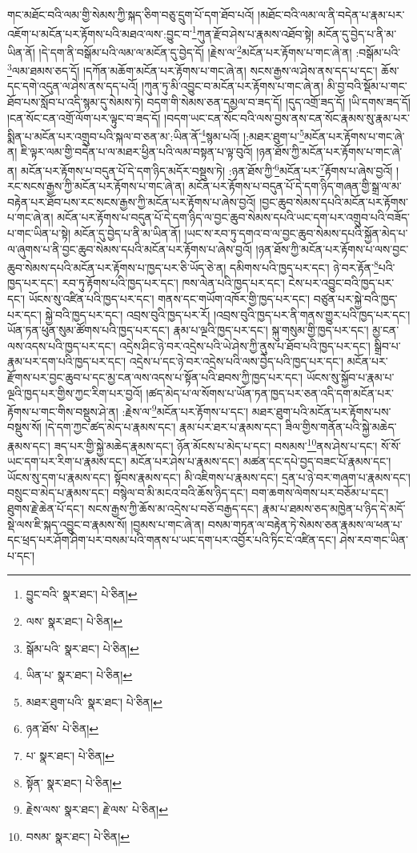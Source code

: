 གང་མཐོང་བའི་ལམ་གྱི་སེམས་ཀྱི་སྐད་ཅིག་བཅུ་དྲུག་པོ་དག་ཐོབ་པའོ། །མཐོང་བའི་ལམ་ལ་ནི་བདེན་པ་རྣམ་པར་འཇོག་པ་མངོན་པར་རྟོགས་པའི་མཐའ་ལས་:བྱུང་བ་\footnote{བྱུང་བའི་  སྣར་ཐང་།  པེ་ཅིན། }ཀུན་རྫོབ་ཤེས་པ་རྣམས་འཐོབ་སྟེ། མངོན་དུ་བྱེད་པ་ནི་མ་ཡིན་ནོ། །དེ་དག་ནི་བསྒོམ་པའི་ལམ་ལ་མངོན་དུ་བྱེད་དོ། །རྗེས་ལ་\footnote{ལས་  སྣར་ཐང་།  པེ་ཅིན། }མངོན་པར་རྟོགས་པ་གང་ཞེ་ན། :བསྒོམ་པའི་\footnote{སྒོམ་པའི་  སྣར་ཐང་།  པེ་ཅིན། }ལམ་ཐམས་ཅད་དོ། །དཀོན་མཆོག་མངོན་པར་རྟོགས་པ་གང་ཞེ་ན། སངས་རྒྱས་ལ་ཤེས་ནས་དད་པ་དང་། ཆོས་དང་དགེ་འདུན་ལ་ཤེས་ནས་དད་པའོ། །ཀུན་ཏུ་མི་འབྱུང་བ་མངོན་པར་རྟོགས་པ་གང་ཞེ་ན། མི་བྱ་བའི་སྡོམ་པ་གང་ཐོབ་པས་སློབ་པ་འདི་སྙམ་དུ་སེམས་ཏེ། བདག་གི་སེམས་ཅན་དམྱལ་བ་ཟད་དོ། །དུད་འགྲོ་ཟད་དོ། །ཡི་དགས་ཟད་དོ། །ངན་སོང་ངན་འགྲོ་ལོག་པར་ལྟུང་བ་ཟད་དོ། །བདག་ཡང་ངན་སོང་བའི་ལས་བྱས་ནས་ངན་སོང་རྣམས་སུ་རྣམ་པར་སྨིན་པ་མངོན་པར་འགྲུབ་པའི་སྐལ་བ་ཅན་མ་:ཡིན་ནོ་\footnote{ཡིན་པ་  སྣར་ཐང་།  པེ་ཅིན། }སྙམ་པའོ། །:མཐར་ཐུག་པ་\footnote{མཐར་ཐུག་པའི་  སྣར་ཐང་།  པེ་ཅིན། }མངོན་པར་རྟོགས་པ་གང་ཞེ་ན། ཇི་ལྟར་ལམ་གྱི་བདེན་པ་ལ་མཐར་ཕྱིན་པའི་ལམ་བསྟན་པ་ལྟ་བུའོ། །ཉན་ཐོས་ཀྱི་མངོན་པར་རྟོགས་པ་གང་ཞེ་ན། མངོན་པར་རྟོགས་པ་བདུན་པོ་དེ་དག་ཉིད་མདོར་བསྡུས་ཏེ། :ཉན་ཐོས་ཀྱི་\footnote{ཉན་ཐོས་  པེ་ཅིན། }མངོན་པར་\footnote{པ་  སྣར་ཐང་།  པེ་ཅིན། }རྟོགས་པ་ཞེས་བྱའོ། །རང་སངས་རྒྱས་ཀྱི་མངོན་པར་རྟོགས་པ་གང་ཞེ་ན། མངོན་པར་རྟོགས་པ་བདུན་པོ་དེ་དག་ཉིད་གཞན་གྱི་སྒྲ་ལ་མ་བརྟེན་པར་ཐོབ་པས་རང་སངས་རྒྱས་ཀྱི་མངོན་པར་རྟོགས་པ་ཞེས་བྱའོ། །བྱང་ཆུབ་སེམས་དཔའི་མངོན་པར་རྟོགས་པ་གང་ཞེ་ན། མངོན་པར་རྟོགས་པ་བདུན་པོ་དེ་དག་ཉིད་ལ་བྱང་ཆུབ་སེམས་དཔའི་ཡང་དག་པར་འགྲུབ་པའི་བཟོད་པ་གང་ཡིན་པ་སྟེ། མངོན་དུ་བྱེད་པ་ནི་མ་ཡིན་ནོ། །ཡང་ས་རབ་ཏུ་དགའ་བ་ལ་བྱང་ཆུབ་སེམས་དཔའི་སྐྱོན་མེད་པ་ལ་ཞུགས་པ་ནི་བྱང་ཆུབ་སེམས་དཔའི་མངོན་པར་རྟོགས་པ་ཞེས་བྱའོ། །ཉན་ཐོས་ཀྱི་མངོན་པར་རྟོགས་པ་ལས་བྱང་ཆུབ་སེམས་དཔའི་མངོན་པར་རྟོགས་པ་ཁྱད་པར་ཅི་ཡོད་ཅེ་ན། དམིགས་པའི་ཁྱད་པར་དང་། ཉེ་བར་རྟོན་\footnote{སྟོན་  སྣར་ཐང་།  པེ་ཅིན། }པའི་ཁྱད་པར་དང་། རབ་ཏུ་རྟོགས་པའི་ཁྱད་པར་དང་། ཁས་ལེན་པའི་ཁྱད་པར་དང་། ངེས་པར་འབྱུང་བའི་ཁྱད་པར་དང་། ཡོངས་སུ་འཛིན་པའི་ཁྱད་པར་དང་། གནས་དང་གཡོག་འཁོར་གྱི་ཁྱད་པར་དང་། བཙུན་པར་སྐྱེ་བའི་ཁྱད་པར་དང་། སྐྱེ་བའི་ཁྱད་པར་དང་། འབྲས་བུའི་ཁྱད་པར་རོ། །འབྲས་བུའི་ཁྱད་པར་ནི་གནས་གྱུར་པའི་ཁྱད་པར་དང་། ཡོན་ཏན་ཕུན་སུམ་ཚོགས་པའི་ཁྱད་པར་དང་། རྣམ་པ་ལྔའི་ཁྱད་པར་དང་། སྐུ་གསུམ་གྱི་ཁྱད་པར་དང་། མྱ་ངན་ལས་འདས་པའི་ཁྱད་པར་དང་། འདྲེས་ཤིང་ཉེ་བར་འདྲེས་པའི་ཡེ་ཤེས་ཀྱི་ནུས་པ་ཐོབ་པའི་ཁྱད་པར་དང་། སྒྲིབ་པ་རྣམ་པར་དག་པའི་ཁྱད་པར་དང་། འདྲེས་པ་དང་ཉེ་བར་འདྲེས་པའི་ལས་བྱེད་པའི་ཁྱད་པར་དང་། མངོན་པར་རྫོགས་པར་བྱང་ཆུབ་པ་དང་མྱ་ངན་ལས་འདས་པ་སྟོན་པའི་ཐབས་ཀྱི་ཁྱད་པར་དང་། ཡོངས་སུ་སྐྱོབ་པ་རྣམ་པ་ལྔའི་ཁྱད་པར་གྱིས་ཀྱང་རིག་པར་བྱའོ། །ཚད་མེད་པ་ལ་སོགས་པ་ཡོན་ཏན་ཁྱད་པར་ཅན་འདི་དག་མངོན་པར་རྟོགས་པ་གང་གིས་བསྡུས་ཤེ་ན། :རྗེས་ལ་\footnote{རྗེས་ལས་  སྣར་ཐང་། རྗེ་ལས་  པེ་ཅིན། }མངོན་པར་རྟོགས་པ་དང་། མཐར་ཐུག་པའི་མངོན་པར་རྟོགས་པས་བསྡུས་སོ། །དེ་དག་ཀྱང་ཚད་མེད་པ་རྣམས་དང་། རྣམ་པར་ཐར་པ་རྣམས་དང་། ཟིལ་གྱིས་གནོན་པའི་སྐྱེ་མཆེད་རྣམས་དང་། ཟད་པར་གྱི་སྐྱེ་མཆེད་རྣམས་དང་། ཉོན་མོངས་པ་མེད་པ་དང་། བསམས་\footnote{བསམ་  སྣར་ཐང་།  པེ་ཅིན། }ནས་ཤེས་པ་དང་། སོ་སོ་ཡང་དག་པར་རིག་པ་རྣམས་དང་། མངོན་པར་ཤེས་པ་རྣམས་དང་། མཚན་དང་དཔེ་བྱད་བཟང་པོ་རྣམས་དང་། ཡོངས་སུ་དག་པ་རྣམས་དང་། སྟོབས་རྣམས་དང་། མི་འཇིགས་པ་རྣམས་དང་། དྲན་པ་ཉེ་བར་གཞག་པ་རྣམས་དང་། བསྲུང་བ་མེད་པ་རྣམས་དང་། བསྙེལ་བ་མི་མངའ་བའི་ཆོས་ཉིད་དང་། བག་ཆགས་ལེགས་པར་བཅོམ་པ་དང་། ཐུགས་རྗེ་ཆེན་པོ་དང་། སངས་རྒྱས་ཀྱི་ཆོས་མ་འདྲེས་པ་བཅོ་བརྒྱད་དང་། རྣམ་པ་ཐམས་ཅད་མཁྱེན་པ་ཉིད་དེ་མདོ་སྡེ་ལས་ཇི་སྐད་འབྱུང་བ་རྣམས་སོ། །བྱམས་པ་གང་ཞེ་ན། བསམ་གཏན་ལ་བརྟེན་ཏེ་སེམས་ཅན་རྣམས་ལ་ཕན་པ་དང་ཕྲད་པར་ཤོག་ཤིག་པར་བསམ་པའི་གནས་པ་ཡང་དག་པར་འབྱོར་པའི་ཏིང་ངེ་འཛིན་དང་། ཤེས་རབ་གང་ཡིན་པ་དང་། 